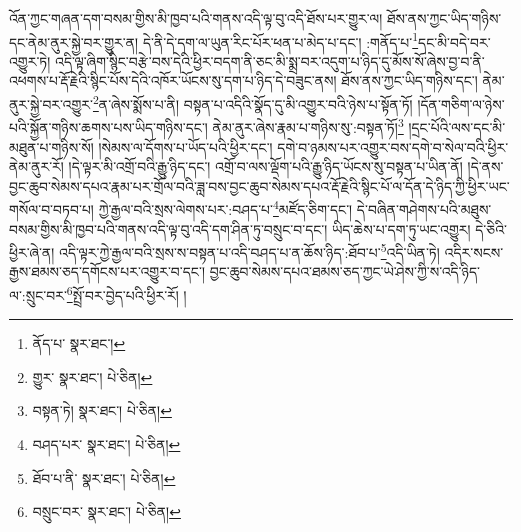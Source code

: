 འོན་ཀྱང་གཞན་དག་བསམ་གྱིས་མི་ཁྱབ་པའི་གནས་འདི་ལྟ་བུ་འདི་ཐོས་པར་གྱུར་ལ། ཐོས་ནས་ཀྱང་ཡིད་གཉིས་དང་ནེམ་ནུར་སྐྱེ་བར་གྱུར་ན། དེ་ནི་དེ་དག་ལ་ཡུན་རིང་པོར་ཕན་པ་མེད་པ་དང་། :གནོད་པ་\footnote{ནོད་པ་  སྣར་ཐང་། }དང་མི་བདེ་བར་འགྱུར་ཏེ། འདི་ལྟ་ཞིག་སྙིང་བརྩེ་བས་དེའི་ཕྱིར་བདག་ནི་ཅང་མི་སྨྲ་བར་འདུག་པ་ཉིད་དུ་མོས་སོ་ཞེས་བྱ་བ་ནི་འཕགས་པ་རྡོ་རྗེའི་སྙིང་པོས་དེའི་འཁོར་ཡོངས་སུ་དག་པ་ཉིད་དེ་བཟུང་ནས། ཐོས་ནས་ཀྱང་ཡིད་གཉིས་དང་། ནེམ་ནུར་སྐྱེ་བར་འགྱུར་\footnote{གྱུར་  སྣར་ཐང་།  པེ་ཅིན། }ན་ཞེས་སྨོས་པ་ནི། བསྟན་པ་འདིའི་སྣོད་དུ་མི་འགྱུར་བའི་ཉེས་པ་སྟོན་ཏོ། །དོན་གཅིག་ལ་ཉེས་པའི་སྐྱོན་གཉིས་ཆགས་པས་ཡིད་གཉིས་དང་། ནེམ་ནུར་ཞེས་རྣམ་པ་གཉིས་སུ་:བསྟན་ཏོ།\footnote{བསྟན་ཏེ།  སྣར་ཐང་།  པེ་ཅིན། } །དྲང་པོའི་ལས་དང་མི་མཐུན་པ་གཉིས་སོ། །སེམས་ལ་དོགས་པ་ཡོད་པའི་ཕྱིར་དང་། དགེ་བ་ཉམས་པར་འགྱུར་བས་དགེ་བ་སེལ་བའི་ཕྱིར་ནེམ་ནུར་རོ། །དེ་ལྟར་མི་འགྲོ་བའི་རྒྱུ་ཉིད་དང་། འགྲོ་བ་ལས་ལྡོག་པའི་རྒྱུ་ཉིད་ཡོངས་སུ་བསྟན་པ་ཡིན་ནོ། །དེ་ནས་བྱང་ཆུབ་སེམས་དཔའ་རྣམ་པར་གྲོལ་བའི་ཟླ་བས་བྱང་ཆུབ་སེམས་དཔའ་རྡོ་རྗེའི་སྙིང་པོ་ལ་དོན་དེ་ཉིད་ཀྱི་ཕྱིར་ཡང་གསོལ་བ་བཏབ་པ། ཀྱེ་རྒྱལ་བའི་སྲས་ལེགས་པར་:བཤད་པ་\footnote{བཤད་པར་  སྣར་ཐང་།  པེ་ཅིན། }མཛོད་ཅིག་དང་། དེ་བཞིན་གཤེགས་པའི་མཐུས་བསམ་གྱིས་མི་ཁྱབ་པའི་གནས་འདི་ལྟ་བུ་འདི་དག་ཤིན་ཏུ་བསྲུང་བ་དང་། ཡིད་ཆེས་པ་དག་ཏུ་ཡང་འགྱུར། དེ་ཅིའི་ཕྱིར་ཞེ་ན། འདི་ལྟར་ཀྱེ་རྒྱལ་བའི་སྲས་ས་བསྟན་པ་འདི་བཤད་པ་ན་ཆོས་ཉིད་:ཐོབ་པ་\footnote{ཐོབ་པ་ནི་  སྣར་ཐང་།  པེ་ཅིན། }འདི་ཡིན་ཏེ། འདིར་སངས་རྒྱས་ཐམས་ཅད་དགོངས་པར་འགྱུར་བ་དང་། བྱང་ཆུབ་སེམས་དཔའ་ཐམས་ཅད་ཀྱང་ཡེ་ཤེས་ཀྱི་ས་འདི་ཉིད་ལ་:སྲུང་བར་\footnote{བསྲུང་བར་  སྣར་ཐང་།  པེ་ཅིན། }སྤྲོ་བར་བྱེད་པའི་ཕྱིར་རོ། །
